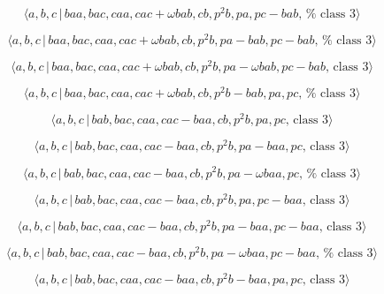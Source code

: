 \documentclass[10pt]{article}
\begin{document}
\begin{equation}
\langle a,b,c\,|\,baa,bac,caa,cac+\omega bab,cb,p^{2}b,pa,pc-bab,\,\text{%
class }3\rangle  \tag{7.2717}
\end{equation}

\begin{equation}
\langle a,b,c\,|\,baa,bac,caa,cac+\omega bab,cb,p^{2}b,pa-bab,pc-bab,\,\text{%
class }3\rangle  \tag{7.2718}
\end{equation}

\begin{equation}
\langle a,b,c\,|\,baa,bac,caa,cac+\omega bab,cb,p^{2}b,pa-\omega
bab,pc-bab,\,\text{class }3\rangle  \tag{7.2719}
\end{equation}

\begin{equation}
\langle a,b,c\,|\,baa,bac,caa,cac+\omega bab,cb,p^{2}b-bab,pa,pc,\,\text{%
class }3\rangle  \tag{7.2720}
\end{equation}

\begin{equation}
\langle a,b,c\,|\,bab,bac,caa,cac-baa,cb,p^2b,pa,pc,\,\text{class }3\rangle 
\tag{7.2721}
\end{equation}

\begin{equation}
\langle a,b,c\,|\,bab,bac,caa,cac-baa,cb,p^2b,pa-baa,pc,\,\text{class }%
3\rangle  \tag{7.2722}
\end{equation}

\begin{equation}
\langle a,b,c\,|\,bab,bac,caa,cac-baa,cb,p^{2}b,pa-\omega baa,pc,\,\text{%
class }3\rangle  \tag{7.2723}
\end{equation}

\begin{equation}
\langle a,b,c\,|\,bab,bac,caa,cac-baa,cb,p^2b,pa,pc-baa,\,\text{class }%
3\rangle  \tag{7.2724}
\end{equation}

\begin{equation}
\langle a,b,c\,|\,bab,bac,caa,cac-baa,cb,p^2b,pa-baa,pc-baa,\,\text{class }%
3\rangle  \tag{7.2725}
\end{equation}

\begin{equation}
\langle a,b,c\,|\,bab,bac,caa,cac-baa,cb,p^{2}b,pa-\omega baa,pc-baa,\,\text{%
class }3\rangle  \tag{7.2726}
\end{equation}

\begin{equation}
\langle a,b,c\,|\,bab,bac,caa,cac-baa,cb,p^2b-baa,pa,pc,\,\text{class }%
3\rangle  \tag{7.2727}
\end{equation}
\end{document}
